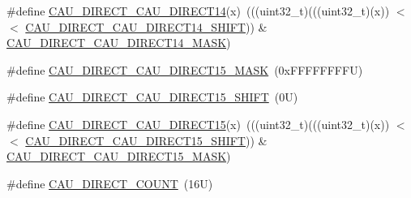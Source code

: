 \begin{DoxyCompactItemize}
\item 
\#define \mbox{\hyperlink{group___c_a_u___register___masks_ga76ec783a1eb1195dc4e7bb7bd9ca654e}{C\+A\+U\+\_\+\+D\+I\+R\+E\+C\+T\+\_\+\+C\+A\+U\+\_\+\+D\+I\+R\+E\+C\+T14}}(x)~(((uint32\+\_\+t)(((uint32\+\_\+t)(x)) $<$$<$ \mbox{\hyperlink{group___c_a_u___register___masks_ga017a8a273655c5f491aa2b348b1ed9bc}{C\+A\+U\+\_\+\+D\+I\+R\+E\+C\+T\+\_\+\+C\+A\+U\+\_\+\+D\+I\+R\+E\+C\+T14\+\_\+\+S\+H\+I\+FT}})) \& \mbox{\hyperlink{group___c_a_u___register___masks_ga8145212bbedada0193bfa6042ea637a6}{C\+A\+U\+\_\+\+D\+I\+R\+E\+C\+T\+\_\+\+C\+A\+U\+\_\+\+D\+I\+R\+E\+C\+T14\+\_\+\+M\+A\+SK}})
\item 
\#define \mbox{\hyperlink{group___c_a_u___register___masks_gabd722971e5e62de19fda379b987cf321}{C\+A\+U\+\_\+\+D\+I\+R\+E\+C\+T\+\_\+\+C\+A\+U\+\_\+\+D\+I\+R\+E\+C\+T15\+\_\+\+M\+A\+SK}}~(0x\+F\+F\+F\+F\+F\+F\+F\+F\+U)
\item 
\#define \mbox{\hyperlink{group___c_a_u___register___masks_ga33f80687a392b95e7b5a8d15530cc2cf}{C\+A\+U\+\_\+\+D\+I\+R\+E\+C\+T\+\_\+\+C\+A\+U\+\_\+\+D\+I\+R\+E\+C\+T15\+\_\+\+S\+H\+I\+FT}}~(0\+U)
\item 
\#define \mbox{\hyperlink{group___c_a_u___register___masks_gaa12d64f2daab5410099ff5be09345b3d}{C\+A\+U\+\_\+\+D\+I\+R\+E\+C\+T\+\_\+\+C\+A\+U\+\_\+\+D\+I\+R\+E\+C\+T15}}(x)~(((uint32\+\_\+t)(((uint32\+\_\+t)(x)) $<$$<$ \mbox{\hyperlink{group___c_a_u___register___masks_ga33f80687a392b95e7b5a8d15530cc2cf}{C\+A\+U\+\_\+\+D\+I\+R\+E\+C\+T\+\_\+\+C\+A\+U\+\_\+\+D\+I\+R\+E\+C\+T15\+\_\+\+S\+H\+I\+FT}})) \& \mbox{\hyperlink{group___c_a_u___register___masks_gabd722971e5e62de19fda379b987cf321}{C\+A\+U\+\_\+\+D\+I\+R\+E\+C\+T\+\_\+\+C\+A\+U\+\_\+\+D\+I\+R\+E\+C\+T15\+\_\+\+M\+A\+SK}})
\item 
\#define \mbox{\hyperlink{group___c_a_u___register___masks_ga9b7cef77f4029ba8654b47ff17315740}{C\+A\+U\+\_\+\+D\+I\+R\+E\+C\+T\+\_\+\+C\+O\+U\+NT}}~(16\+U)
\end{DoxyCompactItemize}
